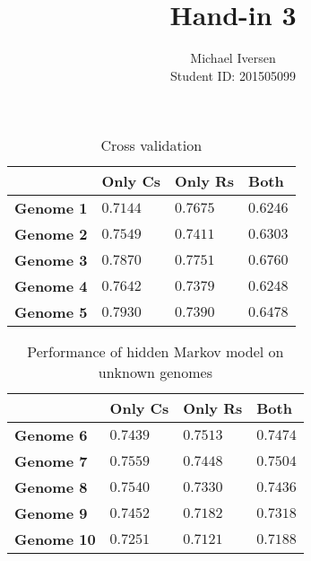 \documentclass{article}
\title{Hand-in 3}
\author{Michael Iversen\\
Student ID: 201505099}
\begin{document}
\maketitle
\begin{table}
	\centering
	\begin{tabular}{|l|lll|}
		\hline
		& \textbf{Only Cs} & \textbf{Only Rs} & \textbf{Both} \\ \hline
		\textbf{Genome 1} & $0.7144$ & $0.7675$ & $0.6246$ \\
		\textbf{Genome 2} & $0.7549$ & $0.7411$ & $0.6303$ \\
		\textbf{Genome 3} & $0.7870$ & $0.7751$ & $0.6760$ \\
		\textbf{Genome 4} & $0.7642$ & $0.7379$ & $0.6248$ \\
		\textbf{Genome 5} & $0.7930$ & $0.7390$ & $0.6478$ \\
		\hline
	\end{tabular}
	\caption{Cross validation}
\end{table}

\begin{table}
	\centering
	\begin{tabular}{|l|lll|}
		\hline
		& \textbf{Only Cs} & \textbf{Only Rs} & \textbf{Both} \\ \hline
		\textbf{Genome 6} & $0.7439$ & $0.7513$ & $0.7474$ \\
		\textbf{Genome 7} & $0.7559$ & $0.7448$ & $0.7504$ \\
		\textbf{Genome 8} & $0.7540$ & $0.7330$ & $0.7436$ \\
		\textbf{Genome 9} & $0.7452$ & $0.7182$ & $0.7318$ \\
		\textbf{Genome 10} & $0.7251$ & $0.7121$ & $0.7188$ \\
		\hline
	\end{tabular}
	\caption{Performance of hidden Markov model on unknown genomes}
\end{table}
\lipsum
\end{document}
